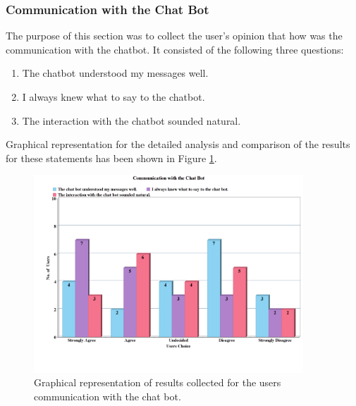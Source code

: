 
\subsubsection*{Communication with the Chat Bot}
The purpose of this section was to collect the user's opinion that how was the communication with the chatbot. It consisted of the following three questions:
\begin{enumerate}
    \item The chatbot understood my messages well.
    \item I always knew what to say to the chatbot.
    \item The interaction with the chatbot sounded natural.
\end{enumerate}
Graphical representation for the detailed analysis and comparison of the results for these statements has been shown in Figure \ref{fig:communwithBot}.

\begin{figure}[!h]
    \centering
    \includegraphics[width=0.9\textwidth]{img/Communication_with_the_Chat_Bot_Updated_2.png}
    \caption{Graphical representation of results collected for the users communication with the chat bot.}
    \label{fig:communwithBot}
\end{figure}


